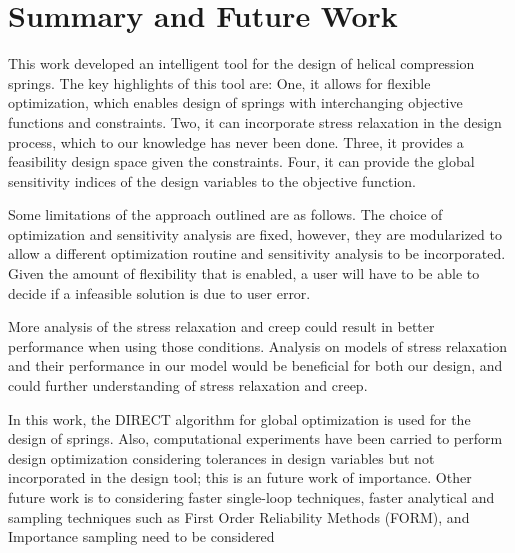 \documentclass[10pt]{article}
\begin{document}
%
%

\section{Summary and Future Work}
\label{sec:Summary}
This work developed an intelligent tool for the design of helical compression springs. The key highlights of this tool are: One, it allows for flexible optimization, which enables design of springs with interchanging objective functions and constraints. Two, it can incorporate stress relaxation in the design process, which to our knowledge has never been done. Three, it provides a feasibility design space given the constraints. Four, it can provide the global sensitivity indices of the design variables to the objective function. 



Some limitations of the approach outlined are as follows. The choice of optimization and sensitivity analysis are fixed, however, they are modularized to allow a different optimization routine and sensitivity analysis to be incorporated. Given the amount of flexibility that is enabled, a user will have to be able to decide if a infeasible solution is due to user error. 

More analysis of the stress relaxation and creep could result in better performance when using those conditions. Analysis on models of stress relaxation and their performance in our model would be beneficial for both our design, and could further understanding of stress relaxation and creep.

In this work, the DIRECT algorithm for global optimization is used for the design of springs. Also, computational experiments have been carried to perform design optimization considering tolerances in design variables but not incorporated in the design tool; this is an future work of importance. Other future work is to considering faster single-loop techniques, faster analytical and sampling techniques such as First Order Reliability Methods (FORM), and Importance sampling need to be considered
\end{document}
